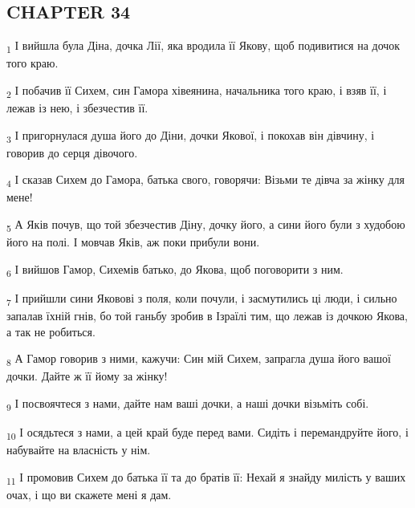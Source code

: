 \subsection{CHAPTER 34}
\begin{tcolorbox}
\textsubscript{1} І вийшла була Діна, дочка Лії, яка вродила її Якову, щоб подивитися на дочок того краю.
\end{tcolorbox}
\begin{tcolorbox}
\textsubscript{2} І побачив її Сихем, син Гамора хівеянина, начальника того краю, і взяв її, і лежав із нею, і збезчестив її.
\end{tcolorbox}
\begin{tcolorbox}
\textsubscript{3} І пригорнулася душа його до Діни, дочки Якової, і покохав він дівчину, і говорив до серця дівочого.
\end{tcolorbox}
\begin{tcolorbox}
\textsubscript{4} І сказав Сихем до Гамора, батька свого, говорячи: Візьми те дівча за жінку для мене!
\end{tcolorbox}
\begin{tcolorbox}
\textsubscript{5} А Яків почув, що той збезчестив Діну, дочку його, а сини його були з худобою його на полі. І мовчав Яків, аж поки прибули вони.
\end{tcolorbox}
\begin{tcolorbox}
\textsubscript{6} І вийшов Гамор, Сихемів батько, до Якова, щоб поговорити з ним.
\end{tcolorbox}
\begin{tcolorbox}
\textsubscript{7} І прийшли сини Яковові з поля, коли почули, і засмутились ці люди, і сильно запалав їхній гнів, бо той ганьбу зробив в Ізраїлі тим, що лежав із дочкою Якова, а так не робиться.
\end{tcolorbox}
\begin{tcolorbox}
\textsubscript{8} А Гамор говорив з ними, кажучи: Син мій Сихем, запрагла душа його вашої дочки. Дайте ж її йому за жінку!
\end{tcolorbox}
\begin{tcolorbox}
\textsubscript{9} І посвоячтеся з нами, дайте нам ваші дочки, а наші дочки візьміть собі.
\end{tcolorbox}
\begin{tcolorbox}
\textsubscript{10} І осядьтеся з нами, а цей край буде перед вами. Сидіть і перемандруйте його, і набувайте на власність у нім.
\end{tcolorbox}
\begin{tcolorbox}
\textsubscript{11} І промовив Сихем до батька її та до братів її: Нехай я знайду милість у ваших очах, і що ви скажете мені я дам.
\end{tcolorbox}
